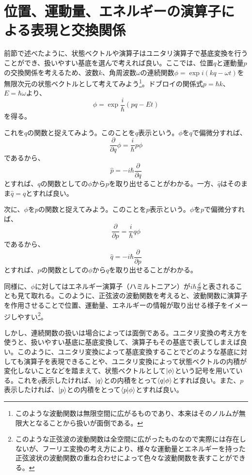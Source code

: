 \section{位置、運動量、エネルギーの演算子による表現と交換関係}\label{section:commutation}
前節で述べたように、状態ベクトルや演算子はユニタリ演算子で基底変換を行うことができ、扱いやすい基底を選んで考えれば良い。ここでは、位置$q$と運動量$p$の交換関係を考えるため、波数$k$、角周波数$\omega$の連続関数$\phi = \exp i(kq - \omega t)$を無限次元の状態ベクトルとして考えてみよう\footnote{このような波動関数は無限空間に広がるものであり、本来はそのノルムが無限大となることから扱いが面倒である。}。ドブロイの関係式$p = \hbar k$、$E = \hbar \omega$より、
\begin{equation}
  \phi = \exp \frac i \hbar (pq - Et)
\end{equation}
を得る。

これを$q$の関数と捉えてみよう。このことを$q$表示という。$\phi$を$q$で偏微分すれば、
\begin{equation}
  \frac{\partial}{\partial q} \phi = \frac{i}{\hbar}p \phi
\end{equation}
であるから、
\begin{equation}
  	\hat p = -i\hbar \frac{\partial}{\partial q}
\end{equation}
とすれば、$q$の関数としての$\phi$から$p$を取り出せることがわかる。一方、$\hat q$はそのまま$\hat q = q$とすれば良い。

次に、$\phi$を$p$の関数と捉えてみよう。このことを$p$表示という。$\phi$を$p$で偏微分すれば、
\begin{equation}
  \frac{\partial}{\partial p} = \frac{i}{\hbar}q\phi
\end{equation}
であるから、
\begin{equation}
  \hat q = -i\hbar \frac{\partial}{\partial p}
\end{equation}
とすれば、$p$の関数としての$\phi$から$q$を取り出せることがわかる。

同様に、$\phi$に対してはエネルギー演算子（ハミルトニアン）が$i\hbar \frac d {dt}$と表されることも見て取れる。このように、正弦波の波動関数を考えると、波動関数に演算子を作用させることで位置、運動量、エネルギーの情報が取り出せる様子をイメージしやすい\footnote{このような正弦波の波動関数は全空間に広がったものなので実際には存在しないが、フーリエ変換の考え方により、様々な運動量とエネルギーを持った正弦波状の波動関数の重ね合わせによって色々な波動関数を表すことができる。}。

しかし、連続関数の扱いは場合によっては面倒である。ユニタリ変換の考え方を使うと、扱いやすい基底に基底変換して、演算子もその基底で表してしまえば良い。このように、ユニタリ変換によって基底変換することでどのような基底に対しても演算子を表現できることや、ユニタリ変換によって状態ベクトルの内積が変化しないことなどを踏まえて、状態ベクトルとして$\ket \phi$という記号を用いている。これを$q$表示したければ、$\ket q$との内積をとって$\braket{q|\phi}$とすれば良い。また、$p$表示したければ、$\ket p$との内積をとって$\braket{p|\phi}$とすれば良い。


